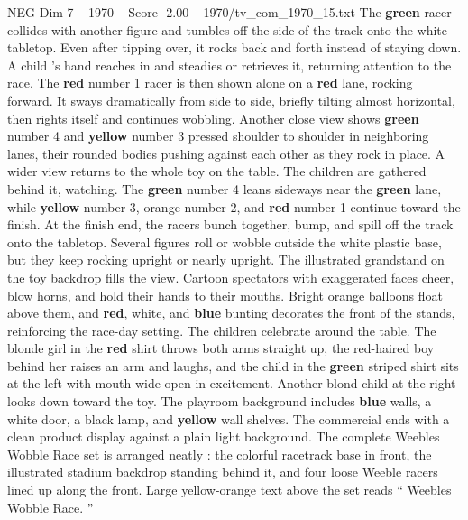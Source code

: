 \begin{textsample}{NEG Dim 7 – 1970 – Score -2.00 – 1970/tv\_com\_1970\_15.txt}
The \textbf{green} racer collides with another figure and tumbles off the side of the track onto the white tabletop.
Even after tipping over, it rocks back and forth instead of staying down.
A child ’s hand reaches in and steadies or retrieves it, returning attention to the race.
The \textbf{red} number 1 racer is then shown alone on a \textbf{red} lane, rocking forward.
It sways dramatically from side to side, briefly tilting almost horizontal, then rights itself and continues wobbling.
Another close view shows \textbf{green} number 4 and \textbf{yellow} number 3 pressed shoulder to shoulder in neighboring lanes, their rounded bodies pushing against each other as they rock in place.
A wider view returns to the whole toy on the table.
The children are gathered behind it, watching.
The \textbf{green} number 4 leans sideways near the \textbf{green} lane, while \textbf{yellow} number 3, orange number 2, and \textbf{red} number 1 continue toward the finish.
At the finish end, the racers bunch together, bump, and spill off the track onto the tabletop.
Several figures roll or wobble outside the white plastic base, but they keep rocking upright or nearly upright.
The illustrated grandstand on the toy backdrop fills the view.
Cartoon spectators with exaggerated faces cheer, blow horns, and hold their hands to their mouths.
Bright orange balloons float above them, and \textbf{red}, white, and \textbf{blue} bunting decorates the front of the stands, reinforcing the race-day setting.
The children celebrate around the table.
The blonde girl in the \textbf{red} shirt throws both arms straight up, the red-haired boy behind her raises an arm and laughs, and the child in the \textbf{green} striped shirt sits at the left with mouth wide open in excitement.
Another blond child at the right looks down toward the toy.
The playroom background includes \textbf{blue} walls, a white door, a black lamp, and \textbf{yellow} wall shelves.
The commercial ends with a clean product display against a plain light background.
The complete Weebles Wobble Race set is arranged neatly : the colorful racetrack base in front, the illustrated stadium backdrop standing behind it, and four loose Weeble racers lined up along the front.
Large yellow-orange text above the set reads “ Weebles Wobble Race. ”

\end{textsample}
